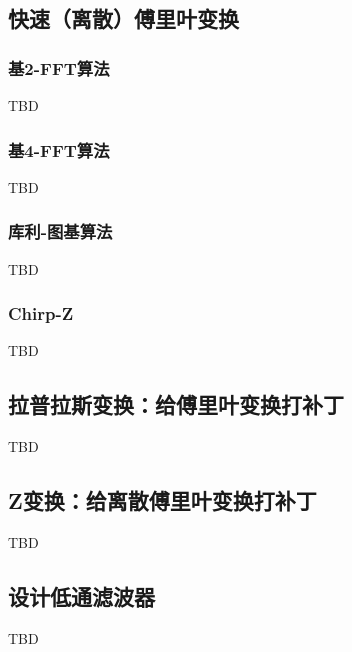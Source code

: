 \subsection{快速（离散）傅里叶变换}
\subsubsection{基2-FFT算法}
TBD
\subsubsection{基4-FFT算法}
TBD
\subsubsection{库利-图基算法}
TBD
\subsubsection{Chirp-Z}
TBD

\subsection{拉普拉斯变换：给傅里叶变换打补丁}
TBD

\subsection{Z变换：给离散傅里叶变换打补丁}
TBD

\subsection{设计低通滤波器}
TBD
